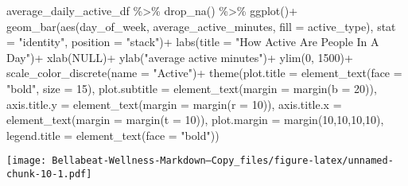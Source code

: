 \documentclass[
]{article}
\newenvironment{Shaded}{\begin{snugshade}}{\end{snugshade}}
\newcommand{\AttributeTok}[1]{\textcolor[rgb]{0.77,0.63,0.00}{#1}}
\newcommand{\ConstantTok}[1]{\textcolor[rgb]{0.00,0.00,0.00}{#1}}
\newcommand{\DecValTok}[1]{\textcolor[rgb]{0.00,0.00,0.81}{#1}}
\newcommand{\FunctionTok}[1]{\textcolor[rgb]{0.00,0.00,0.00}{#1}}
\newcommand{\NormalTok}[1]{#1}
\newcommand{\SpecialCharTok}[1]{\textcolor[rgb]{0.00,0.00,0.00}{#1}}
\newcommand{\StringTok}[1]{\textcolor[rgb]{0.31,0.60,0.02}{#1}}
\begin{document}
\begin{Shaded}
\begin{Highlighting}[]
\NormalTok{average\_daily\_active\_df }\SpecialCharTok{\%\textgreater{}\%}
  \FunctionTok{drop\_na}\NormalTok{() }\SpecialCharTok{\%\textgreater{}\%} 
  \FunctionTok{ggplot}\NormalTok{()}\SpecialCharTok{+}
  \FunctionTok{geom\_bar}\NormalTok{(}\FunctionTok{aes}\NormalTok{(day\_of\_week, average\_active\_minutes, }\AttributeTok{fill =}\NormalTok{ active\_type), }
           \AttributeTok{stat =} \StringTok{"identity"}\NormalTok{, }\AttributeTok{position =} \StringTok{"stack"}\NormalTok{)}\SpecialCharTok{+}
  \FunctionTok{labs}\NormalTok{(}\AttributeTok{title =} \StringTok{"How Active Are People In A Day"}\NormalTok{)}\SpecialCharTok{+}
  \FunctionTok{xlab}\NormalTok{(}\ConstantTok{NULL}\NormalTok{)}\SpecialCharTok{+}
  \FunctionTok{ylab}\NormalTok{(}\StringTok{"average active minutes"}\NormalTok{)}\SpecialCharTok{+}
  \FunctionTok{ylim}\NormalTok{(}\DecValTok{0}\NormalTok{, }\DecValTok{1500}\NormalTok{)}\SpecialCharTok{+}
  \FunctionTok{scale\_color\_discrete}\NormalTok{(}\AttributeTok{name =} \StringTok{"Active"}\NormalTok{)}\SpecialCharTok{+}
  \FunctionTok{theme}\NormalTok{(}\AttributeTok{plot.title =} \FunctionTok{element\_text}\NormalTok{(}\AttributeTok{face =} \StringTok{"bold"}\NormalTok{, }\AttributeTok{size =} \DecValTok{15}\NormalTok{),}
        \AttributeTok{plot.subtitle =} \FunctionTok{element\_text}\NormalTok{(}\AttributeTok{margin =} \FunctionTok{margin}\NormalTok{(}\AttributeTok{b =} \DecValTok{20}\NormalTok{)),}
        \AttributeTok{axis.title.y =} \FunctionTok{element\_text}\NormalTok{(}\AttributeTok{margin =} \FunctionTok{margin}\NormalTok{(}\AttributeTok{r =} \DecValTok{10}\NormalTok{)),}
        \AttributeTok{axis.title.x =} \FunctionTok{element\_text}\NormalTok{(}\AttributeTok{margin =} \FunctionTok{margin}\NormalTok{(}\AttributeTok{t =} \DecValTok{10}\NormalTok{)),}
        \AttributeTok{plot.margin =} \FunctionTok{margin}\NormalTok{(}\DecValTok{10}\NormalTok{,}\DecValTok{10}\NormalTok{,}\DecValTok{10}\NormalTok{,}\DecValTok{10}\NormalTok{),}
        \AttributeTok{legend.title =} \FunctionTok{element\_text}\NormalTok{(}\AttributeTok{face =} \StringTok{"bold"}\NormalTok{))}
\end{Highlighting}
\end{Shaded}

\texttt{[image: Bellabeat-Wellness-Markdown---Copy\_files/figure-latex/unnamed-chunk-10-1.pdf]}
\end{document}
